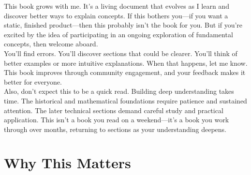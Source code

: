 This book grows with me. It's a living document that evolves as I learn and discover better ways to explain concepts. If this bothers you—if you want a static, finished product—then this probably isn't the book for you. But if you're excited by the idea of participating in an ongoing exploration of fundamental concepts, then welcome aboard.\\
You'll find errors. You'll discover sections that could be clearer. You'll think of better examples or more intuitive explanations. When that happens, let me know. This book improves through community engagement, and your feedback makes it better for everyone.\\
Also, don't expect this to be a quick read. Building deep understanding takes time. The historical and mathematical foundations require patience and sustained attention. The later technical sections demand careful study and practical application. This isn't a book you read on a weekend—it's a book you work through over months, returning to sections as your understanding deepens.\\

\section*{Why This Matters}

